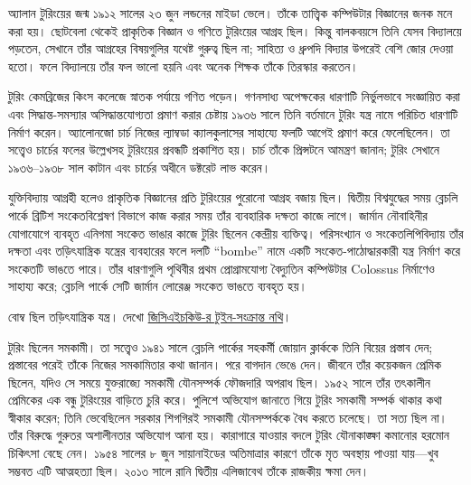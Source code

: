 \documentclass[../../../include/open-logic-section]{subfiles}
\begin{document}


অ্যালান টুরিংয়ের জন্ম ১৯১২ সালের ২৩ জুন
লন্ডনের মাইডা ভেলে। তাঁকে তাত্ত্বিক কম্পিউটার
বিজ্ঞানের জনক মনে করা হয়। ছোটবেলা থেকেই
প্রাকৃতিক বিজ্ঞান ও গণিতে টুরিংয়ের আগ্রহ ছিল।
কিন্তু বালকবয়সে তিনি যেসব বিদ্যালয়ে
পড়তেন, সেখানে তাঁর আগ্রহের বিষয়গুলির
যথেষ্ট গুরুত্ব ছিল না; সাহিত্য ও ধ্রুপদি
বিদ্যার উপরেই বেশি জোর দেওয়া হতো।
ফলে বিদ্যালয়ে তাঁর ফল ভালো হয়নি এবং
অনেক শিক্ষক তাঁকে তিরস্কার করতেন।


টুরিং কেমব্রিজের কিংস কলেজে স্নাতক
পর্যায়ে গণিত পড়েন। গণনসাধ্য অপেক্ষকের
ধারণাটি নির্ভুলভাবে সংজ্ঞায়িত করা এবং
সিদ্ধান্ত-সমস্যার অসিদ্ধান্তযোগ্যতা প্রমাণ
করার চেষ্টায় ১৯৩৬ সালে তিনি বর্তমানে
টুরিং যন্ত্র নামে পরিচিত ধারণাটি নির্মাণ
করেন। অ্যালোনজো চার্চ নিজের ল্যাম্বডা
ক্যালকুলাসের সাহায্যে ফলটি আগেই
প্রমাণ করে ফেলেছিলেন। তা সত্ত্বেও
চার্চের ফলের উল্লেখসহ টুরিংয়ের
প্রবন্ধটি প্রকাশিত হয়। চার্চ তাঁকে
প্রিন্সটনে আমন্ত্রণ জানান; টুরিং
সেখানে ১৯৩৬--১৯৩৮ সাল কাটান
এবং চার্চের অধীনে ডক্টরেট লাভ করেন।

যুক্তিবিদ্যায় আগ্রহী হলেও প্রাকৃতিক
বিজ্ঞানের প্রতি টুরিংয়ের পুরোনো
আগ্রহ বজায় ছিল। দ্বিতীয় বিশ্বযুদ্ধের
সময় ব্লেচলি পার্কে ব্রিটিশ সংকেতবিশ্লেষণ
বিভাগে কাজ করার সময় তাঁর ব্যবহারিক
দক্ষতা কাজে লাগে। জার্মান নৌবাহিনীর
যোগাযোগে ব্যবহৃত এনিগমা সংকেত
ভাঙার কাজে টুরিং ছিলেন কেন্দ্রীয়
ব্যক্তিত্ব। পরিসংখ্যান ও সংকেতলিপিবিদ্যায়
তাঁর দক্ষতা এবং তড়িৎযান্ত্রিক যন্ত্রের
ব্যবহারের ফলে দলটি “bombe” নামে
একটি সংকেত-পাঠোদ্ধারকারী যন্ত্র
নির্মাণ করে সংকেতটি ভাঙতে পারে।
তাঁর ধারণাগুলি পৃথিবীর প্রথম
প্রোগ্রামযোগ্য বৈদ্যুতিন কম্পিউটার
Colossus নির্মাণেও সাহায্য করে;
ব্লেচলি পার্কে সেটি জার্মান লোরেঞ্জ
সংকেত ভাঙতে ব্যবহৃত হয়।

\par\smallskip\noindent বোম্ব ছিল তড়িৎযান্ত্রিক যন্ত্র। দেখো \href{https://www.gchq.gov.uk/person/peter-twinn}{জিসিএইচকিউ-র টুইন-সংক্রান্ত নথি}।

টুরিং ছিলেন সমকামী। তা সত্ত্বেও
১৯৪১ সালে ব্লেচলি পার্কের সহকর্মী
জোয়ান ক্লার্ককে তিনি বিয়ের প্রস্তাব
দেন; প্রস্তাবের পরেই তাঁকে নিজের
সমকামিতার কথা জানান। পরে বাগদান ভেঙে দেন। জীবনে তাঁর
কয়েকজন প্রেমিক ছিলেন, যদিও সে
সময়ে যুক্তরাজ্যে সমকামী যৌনসম্পর্ক
ফৌজদারি অপরাধ ছিল। ১৯৫২ সালে
তাঁর তৎকালীন প্রেমিকের এক বন্ধু
টুরিংয়ের বাড়িতে চুরি করে। পুলিশে
অভিযোগ জানাতে গিয়ে টুরিং
সমকামী সম্পর্ক থাকার কথা স্বীকার
করেন; তিনি ভেবেছিলেন সরকার
শিগগিরই সমকামী যৌনসম্পর্ককে
বৈধ করতে চলেছে। তা সত্য ছিল না।
তাঁর বিরুদ্ধে গুরুতর অশালীনতার
অভিযোগ আনা হয়। কারাগারে
যাওয়ার বদলে টুরিং যৌনাকাঙ্ক্ষা
কমানোর হরমোন চিকিৎসা বেছে
নেন। ১৯৫৪ সালের ৮ জুন
সায়ানাইডের অতিমাত্রার কারণে
তাঁকে মৃত অবস্থায় পাওয়া যায়—খুব
সম্ভবত এটি আত্মহত্যা ছিল।
২০১৩ সালে রানি দ্বিতীয় এলিজাবেথ
তাঁকে রাজকীয় ক্ষমা দেন।
\end{document}
